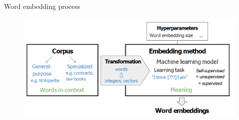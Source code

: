 \begin{frame}[allowframebreaks]{Word embedding process}
    \begin{figure}
        \centering
        \includegraphics[width=\textwidth,height=0.8\textheight,keepaspectratio]{images/vector-space/word-embed-proc.png}
    \end{figure}
\end{frame}
